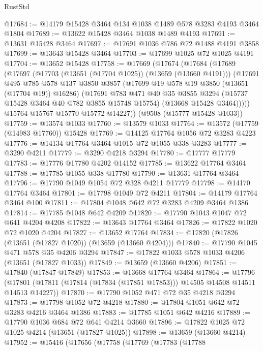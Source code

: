 \begin{lexlean}{RustStd}
\begin{coremodule}
@17684 := @14179 @15428 @3464 @134 @1038 @1489 @578 @3283 @4193 @3464 @1804
@17689 := @13622 @15428 @3464 @1038 @1489 @4193
@17691 := @13631 @15428 @3464
@17697 := @17691 @1036 @786 @72 @1488 @4191 @3858
@17699 := @13643 @15428 @3464
@17703 := @17699 @1025 @72 @1025 @4191
@17704 := @13652 @15428
@17758 := @17669
    (@17674
      (@17684
        (@17689
          (@17697
            (@17703 (@13651 (@17704 @1025)) (@13659 (@13660 @4191)))
            (@17691
              @495
              @785
              @578
              @137
              @3850
              @3857
              (@17699 @19 @578 @19 @3850 (@13651 (@17704 @19)) @16286)
              (@17691
                @783
                @471
                @40
                @35
                @3855
                @3294
                (@15737 @15428 @3464 @40 @782 @3855 @15748 @15754)
                (@13668 @15428 @3464)))))
        @15764
        @15767
        @15770
        @15772
        @14227))
    (@9508 (@15777 @15428 @1033))
@17759 := @13574 @1033
@17760 := @13579 @1033
@17764 := @13572 (@17759 (@14983 @17760)) @15428
@17769 := @14125 @17764 @1056 @72 @3283 @4223
@17776 := @14134 @17764 @3464 @1015 @72 @1055 @338 @3283
@17777 := @3290 @4211
@17779 := @3290 @4218 @3294
@17780 := @17777 @17779
@17783 := @17776 @17780 @4202 @14152
@17785 := @13622 @17764 @3464
@17788 := @17785 @1055 @338 @17780
@17790 := @13631 @17764 @3464
@17796 := @17790 @1049 @1054 @72 @328 @4211 @17779
@17798 := @14170 @17764 @3464
@17801 := @17798 @1049 @72 @4211
@17804 := @14179 @17764 @3464 @100
@17811 := @17804 @1048 @642 @72 @3283 @4209 @3464 @1386
@17814 := @17785 @1048 @642 @4209
@17820 := @17790 @1043 @1047 @72 @641 @4204 @4208
@17822 := @13643 @17764 @3464
@17826 := @17822 @1020 @72 @1020 @4204
@17827 := @13652 @17764
@17834 := @17820 (@17826 (@13651 (@17827 @1020)) (@13659 (@13660 @4204)))
@17840 := @17790 @1045 @471 @578 @35 @4206 @3294
@17847 := @17822 @1033 @578 @1033 @4206 (@13651 (@17827 @1033))
@17849 := @13659 (@13660 @4206)
@17851 := @17840 (@17847 @17849)
@17853 := @13668 @17764 @3464
@17864 := @17796
    (@17801 (@17811 (@17814 (@17834 (@17851 @17853))) @14505 @14508 @14511 @14513 @14227))
@17870 := @17790 @1052 @471 @72 @35 @4218 @3294
@17873 := @17798 @1052 @72 @4218
@17880 := @17804 @1051 @642 @72 @3283 @4216 @3464 @1386
@17883 := @17785 @1051 @642 @4216
@17889 := @17790 @1036 @684 @72 @641 @4214 @3660
@17896 := @17822 @1025 @72 @1025 @4214 (@13651 (@17827 @1025))
@17898 := @13659 (@13660 @4214)
@17952 := @15416
    (@17656
      (@17758
        (@17769
          (@17783
            (@17788

\end{coremodule}
\end{lexlean}

